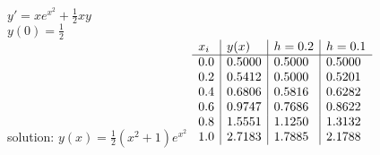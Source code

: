 {
$\displaystyle y' = xe^{x^2}+\frac{1}{2}xy$\\
$\displaystyle y(0)=\frac{1}{2}$\\
solution: $\displaystyle y(x) = \frac{1}{2}(x^2+1)e^{x^2}$
}
{
	$\begin{array}[b]{l | l | l | l}
		x_i & y(x)   & h = 0.2 & h = 0.1 \\ \hline
		0.0 & 0.5000 & 0.5000  & 0.5000  \\
		0.2 & 0.5412 & 0.5000  & 0.5201  \\
		0.4 & 0.6806 & 0.5816  & 0.6282  \\
		0.6 & 0.9747 & 0.7686  & 0.8622  \\
		0.8 & 1.5551 & 1.1250  & 1.3132  \\
		1.0 & 2.7183 & 1.7885  & 2.1788
	\end{array}$
}